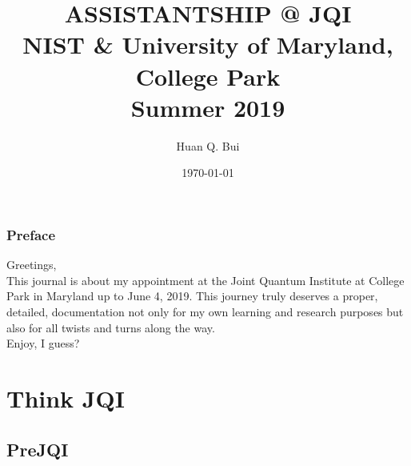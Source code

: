 \documentclass{book}
\theoremstyle{definition}
\begin{document}
	\begin{titlepage}\centering
		\clearpage
		\title{\textsc{\bf{ASSISTANTSHIP @ JQI}}\\\smallskip NIST \& University of Maryland, College Park\\Summer 2019\\}
		\author{\bigskip Huan Q. Bui}
		\date{\today}
		\maketitle
		\thispagestyle{empty}
	\end{titlepage}

\newpage

\subsection*{Preface}

Greetings,\\

This journal is about my appointment at the Joint Quantum Institute at College Park in Maryland up to June 4, 2019. This journey truly deserves a proper, detailed, documentation not only for my own learning and research purposes but also for all twists and turns along the way.  \\

Enjoy, I guess?


\newpage
\tableofcontents
\newpage

\chapter{Think JQI}

\section*{Pre\textendash JQI}

%
%
%
%
\end{document}
